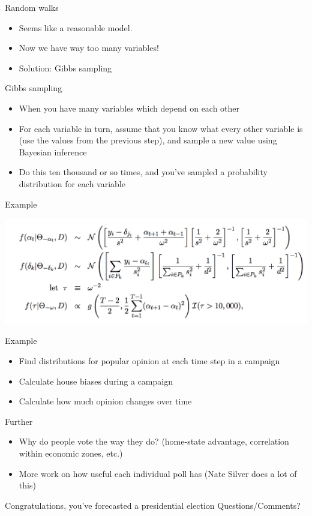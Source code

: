 \documentclass[14pt, t]{beamer}
\begin{document}
\begin{frame}{Random walks}
	\begin{itemize}
		\item Seems like a reasonable model.
		\item Now we have way too many variables!
		\item Solution: Gibbs sampling
	\end{itemize}
\end{frame}

\begin{frame}{Gibbs sampling}
\begin{itemize}
	\item When you have many variables which depend on each other
	\item For each variable in turn, assume that you know what every other variable is (use the values from the previous step), and sample a new value using Bayesian inference
	\item Do this ten thousand or so times, and you've sampled a probability distribution for each variable
\end{itemize}
\end{frame}

\begin{frame}{Example}
\begin{center}
	\includegraphics[width=\textwidth]{strauss-gibbs.png}
\end{center}
\end{frame}

\begin{frame}{Example}
\begin{itemize}
	\item Find distributions for popular opinion at each time step in a campaign
	\item Calculate house biases during a campaign
	\item Calculate how much opinion changes over time
\end{itemize}
\end{frame}

\begin{frame}{Further}
\begin{itemize}
\item Why do people vote the way they do? (home-state advantage, correlation within economic zones, etc.)
\item More work on how useful each individual poll has (Nate Silver does a lot of this)
\end{itemize}
\end{frame}

\begin{frame}{Congratulations, you've forecasted a presidential election}
Questions/Comments?
\end{frame}
\end{document}
